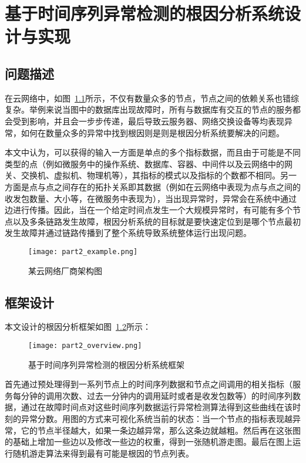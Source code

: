 
\chapter{基于时间序列异常检测的根因分析系统设计与实现}
\label{cha:root:cause:analysis}
\section{问题描述}
在云网络中，如图~\ref{fig:part2_example}所示，不仅有数量众多的节点，节点之间的依赖关系也错综复杂。举例来说当图中的数据库出现故障时，所有与数据库有交互的节点的服务都会受到影响，并且会一步步传递，最后导致云服务器、网络交换设备等均表现异常，如何在数量众多的异常中找到根因则是则是根因分析系统要解决的问题。

本文中认为，可以获得的输入一方面是单点的多个指标数据，而且由于可能是不同类型的点（例如微服务中的操作系统、数据库、容器、中间件以及云网络中的网关、交换机、虚拟机、物理机等），其指标的模式以及指标的个数都不相同。另一方面是点与点之间存在的拓扑关系即其数据（例如在云网络中表现为点与点之间的收发包数量、大小等，在微服务中表现为），当出现异常时，异常会在系统中通过边进行传播。因此，当在一个给定时间点发生一个大规模异常时，有可能有多个节点以及多条链路发生故障，根因分析系统的目标就是要快速定位到是哪个节点最初发生故障并通过链路传播到了整个系统导致系统整体运行出现问题。

\begin{figure}[htbp]
  \centering
  \texttt{[image: part2\_example.png]}
  \caption{某云网络厂商架构图}
  \label{fig:part2_example}
\end{figure}

\section{框架设计}
本文设计的根因分析框架如图~\ref{fig:part2-overview}所示：
\begin{figure}[htbp]
    \centering
    \texttt{[image: part2\_overview.png]}
    \caption{基于时间序列异常检测的根因分析系统框架}
    \label{fig:part2-overview}
  \end{figure}

首先通过预处理得到一系列节点上的时间序列数据和节点之间调用的相关指标（服务每分钟的调用次数、过去一分钟内的调用延时或者是收发包数等）的时间序列数据，通过在故障时间点对这些时间序列数据运行异常检测算法得到这些曲线在该时刻的异常分数。用图的方式来可视化系统当前的状态：当一个节点的指标表现越异常，它的节点半径越大，如果一条边越异常，那么这条边就越粗。然后再在这张图的基础上增加一些边以及修改一些边的权重，得到一张随机游走图。最后在图上运行随机游走算法来得到最有可能是根因的节点列表。


